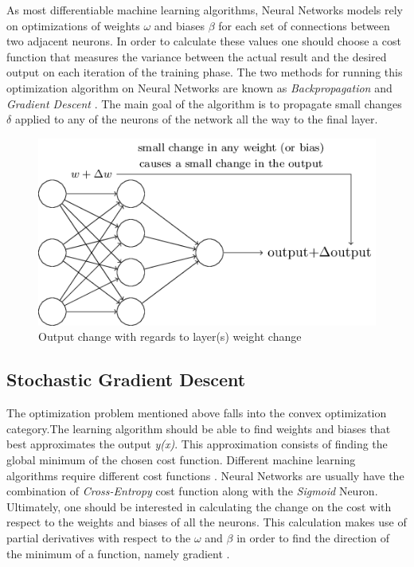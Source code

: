 \documentclass{article}
\begin{document}
As most differentiable machine learning algorithms, Neural Networks models rely on optimizations of weights $\omega$ and biases $\beta$ for each set of connections between two adjacent neurons. In order to calculate these values one should  choose a cost function that measures the variance between the actual result and the desired output on each iteration of the training phase. The two methods for running this optimization algorithm on Neural Networks are known as \textit{Backpropagation} and \textit{Gradient Descent} \cite{goodfellow2016_book}. The main goal of the algorithm is to propagate small changes $\delta$ applied to any of the neurons of the network all the way to the final layer.

\begin{figure}[h!]
\centering
	\includegraphics[scale=0.5]{net_change.png}
\caption{Output change with regards to layer(s) weight change \cite{nielsen2016}}
\label{fig:net_change}
\end{figure}

\subsection{Stochastic Gradient Descent}\label{subsec:stochastic}


The optimization problem mentioned above falls into the convex optimization category.The learning algorithm should be able to find weights and biases that best approximates the output \textit{y(x)}. This approximation consists of finding the global minimum of the chosen cost function. Different machine learning algorithms require different cost functions \cite{nielsen2016}. Neural Networks are usually have the combination of \textit{Cross-Entropy} cost function along with the \textit{Sigmoid} Neuron. Ultimately, one should be interested in calculating the change on the cost with respect to the weights and biases of all the neurons. This calculation makes use of partial derivatives with respect to the $\omega$ and $\beta$ in order to find the direction of the minimum of a function, namely gradient \cite{goodfellow2016_book}.
\end{document}
